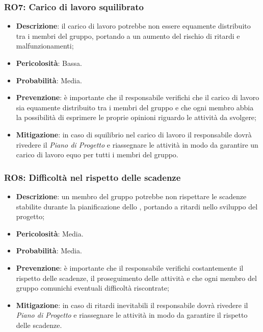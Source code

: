 \subsubsection{RO7: Carico di lavoro squilibrato}
\label{rischio:RO7}
\begin{itemize}
    \item \textbf{Descrizione}: il carico di lavoro potrebbe non essere equamente distribuito tra i membri del gruppo, portando a un aumento del rischio di ritardi e malfunzionamenti;
    \item \textbf{Pericolosità}: Bassa.
    \item \textbf{Probabilità}: Media.
    \item \textbf{Prevenzione}: è importante che il responsabile verifichi che il carico di lavoro sia equamente distribuito tra i membri del gruppo e che ogni membro abbia la possibilità di esprimere le proprie opinioni riguardo le attività da svolgere;
    \item \textbf{Mitigazione}: in caso di squilibrio nel carico di lavoro il responsabile dovrà rivedere il \textit{Piano di Progetto} e riassegnare le attività in modo da garantire un carico di lavoro equo per tutti i membri del gruppo.
\end{itemize} 

\subsubsection{RO8: Difficoltà nel rispetto delle scadenze}
\label{rischio:RO8}
\begin{itemize}
    \item \textbf{Descrizione}: un membro del gruppo potrebbe non rispettare le scadenze stabilite durante la pianificazione dello , portando a ritardi nello sviluppo del progetto;
    \item \textbf{Pericolosità}: Media.
    \item \textbf{Probabilità}: Media.
    \item \textbf{Prevenzione}: è importante che il responsabile verifichi costantemente il rispetto delle scadenze, il proseguimento delle attività e che ogni membro del gruppo comunichi eventuali difficoltà riscontrate;
    \item \textbf{Mitigazione}: in caso di ritardi inevitabili il responsabile dovrà rivedere il \textit{Piano di Progetto} e riassegnare le attività in modo da garantire il rispetto delle scadenze.
\end{itemize}